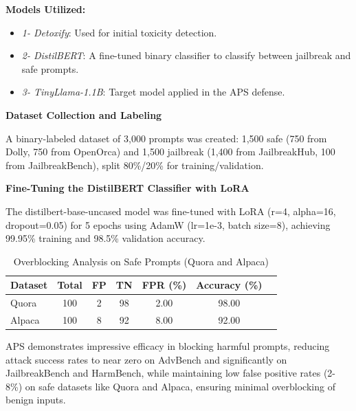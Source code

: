 \documentclass[conference]{IEEEtran}
\begin{document}

\textbf{Models Utilized: }

\begin{itemize}[left=0pt, label={}, topsep=2pt, itemsep=2pt]
    \item \textit{1- Detoxify}: Used for initial toxicity detection.
    \item \textit{2- DistilBERT}: A fine-tuned binary classifier to classify between jailbreak and safe prompts.
    \item \textit{3- TinyLlama-1.1B}: Target model applied in the APS defense.
\end{itemize}

\textbf{Dataset Collection and Labeling}

A binary-labeled dataset of 3,000 prompts was created: 1,500 safe (750 from Dolly, 750 from OpenOrca) and 1,500 jailbreak (1,400 from JailbreakHub, 100 from JailbreakBench), split 80\%/20\% for training/validation.

\textbf{Fine-Tuning the DistilBERT Classifier with LoRA}

The distilbert-base-uncased model was fine-tuned with LoRA (r=4, alpha=16, dropout=0.05) for 5 epochs using AdamW (lr=1e-3, batch size=8), achieving 99.95\% training and 98.5\% validation accuracy.
\begin{table}[h]
\centering
\caption{Adversarial Prompt Shield (APS) Results}
\label{tab:aps_results}
\end{table}

\begin{table}[H]
\centering
\caption{Overblocking Analysis on Safe Prompts (Quora and Alpaca)}
\label{tab:safe_eval}
\begin{tabular}{lcccccc}
\toprule
\textbf{Dataset} & \textbf{Total} & \textbf{FP} & \textbf{TN} & \textbf{FPR (\%)}  & \textbf{Accuracy (\%)} \\
\midrule
Quora   & 100 & 2  & 98  & 2.00   & 98.00 \\
Alpaca  & 100 & 8  & 92  & 8.00   & 92.00 \\
\bottomrule
\end{tabular}
\end{table}
APS demonstrates impressive efficacy in blocking harmful prompts, reducing attack success rates to near zero on AdvBench and significantly on JailbreakBench and HarmBench, while maintaining low false positive rates (2-8\%) on safe datasets like Quora and Alpaca, ensuring minimal overblocking of benign inputs.
\vspace{0.1 cm}
\end{document}
